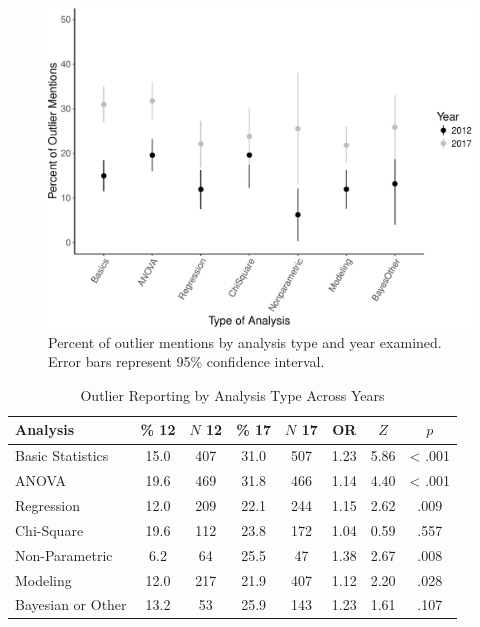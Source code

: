 \documentclass[english,man]{apa6}
\theoremstyle{definition}
\theoremstyle{definition}
\theoremstyle{definition}
\theoremstyle{remark}
\begin{document}
\begin{figure}
\centering
\includegraphics{outliers_manuscript_files/figure-latex/analyses-graph-1.pdf}
\caption{\label{fig:analyses-graph}Percent of outlier mentions by analysis
type and year examined. Error bars represent 95\% confidence interval.}
\end{figure}

\begin{table}[tbp]
\begin{center}
\begin{threeparttable}
\caption{\label{tab:analysis-table}Outlier Reporting by Analysis Type Across Years}
\begin{tabular}{lccccccc}
\toprule
Analysis & \% 12 & $N$ 12 & \% 17 & $N$ 17 & OR & $Z$ & $p$\\
\midrule
Basic Statistics & 15.0 & 407 & 31.0 & 507 & 1.23 & 5.86 & < .001\\
ANOVA & 19.6 & 469 & 31.8 & 466 & 1.14 & 4.40 & < .001\\
Regression & 12.0 & 209 & 22.1 & 244 & 1.15 & 2.62 & .009\\
Chi-Square & 19.6 & 112 & 23.8 & 172 & 1.04 & 0.59 & .557\\
Non-Parametric & 6.2 & 64 & 25.5 & 47 & 1.38 & 2.67 & .008\\
Modeling & 12.0 & 217 & 21.9 & 407 & 1.12 & 2.20 & .028\\
Bayesian or Other & 13.2 & 53 & 25.9 & 143 & 1.23 & 1.61 & .107\\
\bottomrule
\end{tabular}
\end{threeparttable}
\end{center}
\end{table}
\end{document}
